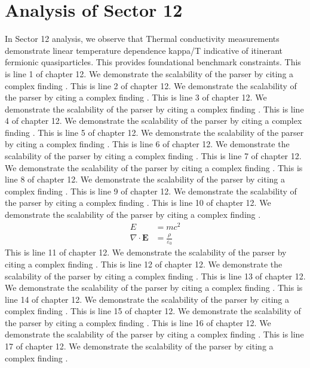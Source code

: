 \chapter{Analysis of Sector 12}

In Sector 12 analysis, we observe that Thermal conductivity measurements demonstrate linear temperature dependence kappa/T indicative of itinerant fermionic quasiparticles. This provides foundational benchmark constraints.
This is line 1 of chapter 12. We demonstrate the scalability of the parser by citing a complex finding \cite{ref12_1}.
This is line 2 of chapter 12. We demonstrate the scalability of the parser by citing a complex finding \cite{ref12_2}.
This is line 3 of chapter 12. We demonstrate the scalability of the parser by citing a complex finding \cite{ref12_3}.
This is line 4 of chapter 12. We demonstrate the scalability of the parser by citing a complex finding \cite{ref12_4}.
This is line 5 of chapter 12. We demonstrate the scalability of the parser by citing a complex finding \cite{ref12_5}.
This is line 6 of chapter 12. We demonstrate the scalability of the parser by citing a complex finding \cite{ref12_6}.
This is line 7 of chapter 12. We demonstrate the scalability of the parser by citing a complex finding \cite{ref12_7}.
This is line 8 of chapter 12. We demonstrate the scalability of the parser by citing a complex finding \cite{ref12_8}.
This is line 9 of chapter 12. We demonstrate the scalability of the parser by citing a complex finding \cite{ref12_9}.
This is line 10 of chapter 12. We demonstrate the scalability of the parser by citing a complex finding \cite{ref12_10}.
\begin{align*}
  E &= mc^2 \\
  \nabla \cdot \mathbf{E} &= \frac{\rho}{\varepsilon_0}
\end{align*}
This is line 11 of chapter 12. We demonstrate the scalability of the parser by citing a complex finding \cite{ref12_11}.
This is line 12 of chapter 12. We demonstrate the scalability of the parser by citing a complex finding \cite{ref12_12}.
This is line 13 of chapter 12. We demonstrate the scalability of the parser by citing a complex finding \cite{ref12_13}.
This is line 14 of chapter 12. We demonstrate the scalability of the parser by citing a complex finding \cite{ref12_14}.
This is line 15 of chapter 12. We demonstrate the scalability of the parser by citing a complex finding \cite{ref12_15}.
This is line 16 of chapter 12. We demonstrate the scalability of the parser by citing a complex finding \cite{ref12_16}.
This is line 17 of chapter 12. We demonstrate the scalability of the parser by citing a complex finding \cite{ref12_17}.
